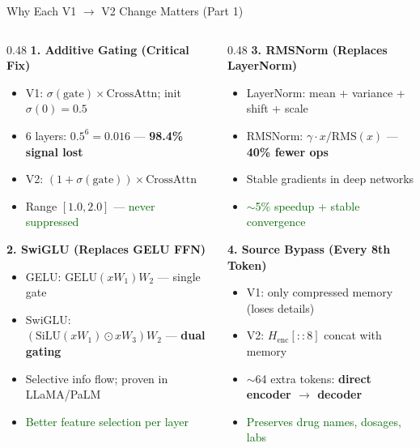 \documentclass[10pt, aspectratio=169]{beamer}
\begin{document}
\begin{frame}{Why Each V1 $\rightarrow$ V2 Change Matters (Part 1)}
  \footnotesize
  \begin{columns}[T]
    \begin{column}{0.48\textwidth}
      \textbf{1. Additive Gating (Critical Fix)}
      \begin{itemize}\setlength{\itemsep}{0pt}
        \item V1: $\sigma(\text{gate}) {\times} \text{CrossAttn}$; init $\sigma(0){=}0.5$
        \item 6 layers: $0.5^6 {=} 0.016$ --- \textbf{98.4\% signal lost}
        \item V2: $(1 {+} \sigma(\text{gate})) {\times} \text{CrossAttn}$
        \item Range $[1.0, 2.0]$ --- \textcolor{darkgreen}{never suppressed}
      \end{itemize}

      \vspace{0.05cm}
      \textbf{2. SwiGLU (Replaces GELU FFN)}
      \begin{itemize}\setlength{\itemsep}{0pt}
        \item GELU: $\text{GELU}(xW_1)W_2$ --- single gate
        \item SwiGLU: $(\text{SiLU}(xW_1) {\odot} xW_3)W_2$ --- \textbf{dual gating}
        \item Selective info flow; proven in LLaMA/PaLM
        \item \textcolor{darkgreen}{Better feature selection per layer}
      \end{itemize}
    \end{column}
    \begin{column}{0.48\textwidth}
      \textbf{3. RMSNorm (Replaces LayerNorm)}
      \begin{itemize}\setlength{\itemsep}{0pt}
        \item LayerNorm: mean + variance + shift + scale
        \item RMSNorm: $\gamma {\cdot} x / \text{RMS}(x)$ --- \textbf{40\% fewer ops}
        \item Stable gradients in deep networks
        \item \textcolor{darkgreen}{$\sim$5\% speedup + stable convergence}
      \end{itemize}

      \vspace{0.05cm}
      \textbf{4. Source Bypass (Every 8th Token)}
      \begin{itemize}\setlength{\itemsep}{0pt}
        \item V1: only compressed memory (loses details)
        \item V2: $H_{\text{enc}}[::8]$ concat with memory
        \item $\sim$64 extra tokens: \textbf{direct encoder $\rightarrow$ decoder}
        \item \textcolor{darkgreen}{Preserves drug names, dosages, labs}
      \end{itemize}
    \end{column}
  \end{columns}
\end{frame}
\end{document}
